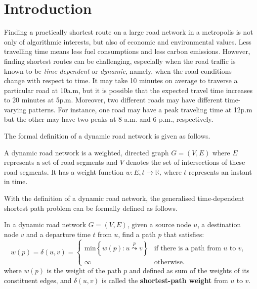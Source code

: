 \chapter{Introduction}

Finding a practically shortest route on a large road network in a metropolis is not only of algorithmic interests, but also of economic and environmental values. Less travelling time means less fuel consumptions and less carbon emissions. However, finding shortest routes can be challenging, especially when the road traffic is known to be \emph{time-dependent} or \emph{dynamic}, namely, when the road conditions change with respect to time. It may take 10 minutes on average to traverse a particular road at 10a.m, but it is possible that the expected travel time increases to 20 minutes at 5p.m. Moreover, two different roads may have different time-varying patterns. For instance, one road may have a peak traveling time at 12p.m but the other may have two peaks at 8 a.m. and 6 p.m., respectively.

The formal definition of a dynamic road network is given as follows.
\begin{defn}
A dynamic road network is a weighted, directed graph $G=(V,E)$ where $E$ represents a set of road segments and $V$ denotes the set of intersections of these road segments. It has a weight function $w : E,t \rightarrow \mathbb{R}$, where $t$ represents an instant in time. 
\end{defn}
With the definition of a dynamic road network, the generalised time-dependent shortest path problem can be formally defined as follows.
\begin{defn}
In a dynamic road network $G=(V,E)$, given a source node $u$, a destination node $v$ and a departure time $t$ from $u$, find a path $p$ that satisfies:
\begin{equation}
w(p)=\delta(u,v)=
\begin{cases}
\text{min}\left\{w(p): u\overset{p}{\leadsto}v \right\} &\text{if there is a path from $u$ to $v$,}\\
\infty &\text{otherwise.}
\end{cases}
\end{equation}
where $w(p)$ is the weight of the path $p$ and defined as sum of the weights of its constituent edges, and $\delta(u,v)$ is called the \textbf{shortest-path weight} from $u$ to $v$.
\end{defn}


